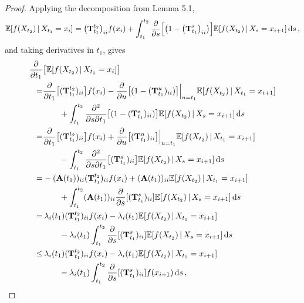 \documentclass[10pt]{article}
\newcommand{\dx}[1][x]{\text{\,d}#1}
\begin{document}
\begin{proof}
Applying the decomposition from Lemma 5.1,
\begin{equation*}
\mathbb{E}[f(X_{t_2})\,\vert\,X_{t_1}=x_i] = \bigl(\mathbf{T}_{t_1}^{t_2}\bigr)_{ii}f(x_i) + \int_{t_1}^{t_2} \frac{\partial}{\partial s}\Bigl[\bigl(1-\bigl(\mathbf{T}_{t_1}^s\bigr)_{ii}\bigr)\Bigr]\mathbb{E}[f(X_{t_2})\,\vert\,X_s=x_{i+1}]\dx[s]\,,
\end{equation*}
and taking derivatives in $t_1$, gives
\begin{align*}
\frac{\partial}{\partial t_1}&\bigl[\mathbb{E}[f(X_{t_2})\,\vert\,X_{t_1}=x_i]\bigr] \\
=& \frac{\partial}{\partial t_1}\bigl[(\mathbf{T}_{t_1}^{t_2})_{ii}\bigr]f(x_i) - \frac{\partial}{\partial u}\bigl[(1-(\mathbf{T}_{t_1}^{u})_{ii})\bigr]\Big\vert_{u=t_1}\mathbb{E}[f(X_{t_2})\,\vert\,X_{t_1}=x_{i+1}] \\
&\quad\quad+ \int_{t_1}^{t_2} \frac{\partial^2}{\partial s\partial t_1}\bigl[(1-(\mathbf{T}_{t_1}^{s})_{ii})\bigr]\mathbb{E}[f(X_{t_2})\,\vert\,X_s=x_{i+1}]\dx[s] \\
=& \frac{\partial}{\partial t_1}\bigl[(\mathbf{T}_{t_1}^{t_2})_{ii}\bigr]f(x_i) + \frac{\partial}{\partial u}\bigl[(\mathbf{T}_{t_1}^{u})_{ii}\bigr]\Big\vert_{u=t_1}\mathbb{E}[f(X_{t_2})\,\vert\,X_{t_1}=x_{i+1}] \\
&\quad\quad- \int_{t_1}^{t_2} \frac{\partial^2}{\partial s\partial t_1}\bigl[(\mathbf{T}_{t_1}^{s})_{ii}\bigr]\mathbb{E}[f(X_{t_2})\,\vert\,X_s=x_{i+1}]\dx[s] \\
=& -(\mathbf{A}(t_1))_{ii}(\mathbf{T}_{t_1}^{t_2})_{ii}f(x_i) + (\mathbf{A}(t_1))_{ii}\mathbb{E}[f(X_{t_2})\,\vert\,X_{t_1}=x_{i+1}] \\
&\quad\quad+ \int_{t_1}^{t_2}(\mathbf{A}(t_1))_{ii}\frac{\partial}{\partial s}[(\mathbf{T}_{t_1}^s)_{ii}]\mathbb{E}[f(X_{t_2})\,\vert\,X_{s}=x_{i+1}]\dx[s] \\
=&\,\lambda_i(t_1)(\mathbf{T}_{t_1}^{t_2})_{ii}f(x_i) - \lambda_i(t_1)\mathbb{E}[f(X_{t_2})\,\vert\,X_{t_1}=x_{i+1}] \\
&\quad\quad- \lambda_i(t_1)\int_{t_1}^{t_2}\frac{\partial}{\partial s}[(\mathbf{T}_{t_1}^s)_{ii}]\mathbb{E}[f(X_{t_2})\,\vert\,X_{s}=x_{i+1}]\dx[s] \\
\leq&\,\lambda_i(t_1)(\mathbf{T}_{t_1}^{t_2})_{ii}f(x_i) - \lambda_i(t_1)\mathbb{E}[f(X_{t_2})\,\vert\,X_{t_1}=x_{i+1}] \\
&\quad\quad- \lambda_i(t_1)\int_{t_1}^{t_2}\frac{\partial}{\partial s}[(\mathbf{T}_{t_1}^s)_{ii}]f(x_{i+1})\dx[s]\,,

\end{align*}
\end{proof}
\end{document}
